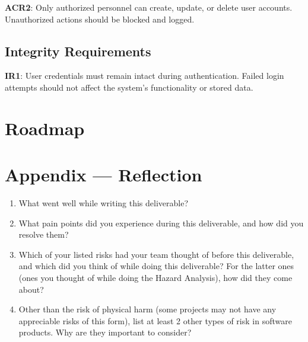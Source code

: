 \documentclass{article}
\begin{document}
\noindent \textbf{ACR2}: Only authorized personnel can create, update, or delete user accounts. Unauthorized actions should be blocked and logged.

\subsection{Integrity Requirements}
\textbf{IR1}: User credentials must remain intact during authentication. Failed login attempts should not affect the system's functionality or stored data.



\section{Roadmap}


\newpage{}

\section*{Appendix --- Reflection}




\begin{enumerate}
    \item What went well while writing this deliverable? 
    \item What pain points did you experience during this deliverable, and how
    did you resolve them?
    \item Which of your listed risks had your team thought of before this
    deliverable, and which did you think of while doing this deliverable? For
    the latter ones (ones you thought of while doing the Hazard Analysis), how
    did they come about?
    \item Other than the risk of physical harm (some projects may not have any
    appreciable risks of this form), list at least 2 other types of risk in
    software products. Why are they important to consider?
\end{enumerate}
\end{document}
